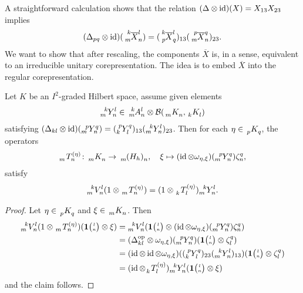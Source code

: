 A straightforward calculation shows that the relation $(\Delta\otimes \operatorname{id})(X)=X_{13}X_{23}$ implies
  \begin{align*}
    (\Delta_{pq} \otimes \id)(\Gr{\overline{X}}{k}{l}{m}{n}) =
     (\Gr{\overline{X}}{k}{l}{p}{q})_{13}(\Gr{\overline{X}}{p}{q}{m}{n})_{23}.
  \end{align*}
We want to show that after rescaling, the components  $\overline{X}$ is, in a sense, equivalent to an irreducible unitary  corepresentation. The idea is to embed $\overline{X}$ into the regular corepresentation.
\begin{Lem} \label{lem:construct-intertwiner} Let $K$ be an $I^{2}$-graded Hilbert space, assume   given elements
  \begin{align*}
    \Gr{Y}{k}{l}{m}{n}\in \Gr{A}{k}{l}{m}{n} \otimes \mathcal{B}(\Grd{K}{m}{n},\Grd{K}{k}{l})
  \end{align*}
   satisfying $    (\Delta_{kl} \otimes \id)(\Gr{Y}{p}{q}{m}{n}) =
     (\Gr{Y}{p}{q}{k}{l})_{13}(\Gr{Y}{k}{l}{m}{n})_{23}
$. Then for each $\eta\in \Grd{K}{p}{q}$,  the operators
\begin{align*}
  \Gr{T}{}{(\eta)}{m}{n} \colon
\Grd{K}{m}{n} \to  \Grd{(H_{h})}{m}{n}, \quad \xi \mapsto (\id \otimes \omega_{\eta,\xi})(\Gr{Y}{p}{q}{m}{n}) \zeta^{q}_{n},
\end{align*}
satisfy
  \begin{align*}
    \Gr{V}{k}{l}{m}{n}(1\otimes \Gr{T}{}{(\eta)}{m}{n}) = (1 \otimes
    \Gr{T}{}{(\eta)}{k}{l})\Gr{Y}{k}{l}{m}{n}.
  \end{align*}
\end{Lem}
\begin{proof}
Let $\eta \in \Grd{K}{p}{q}$ and  $\xi \in \Grd{K}{m}{n}$. Then
  \begin{align*}
    \Gr{V}{k}{l}{m}{n}(1\otimes \Gr{T}{}{(\eta)}{m}{n})(\UnitC{l}{n}\otimes \xi) &= \Gr{V}{k}{l}{m}{n}(\UnitC{l}{n}
    \otimes (\id \otimes \omega_{\eta,\xi})(\Gr{Y}{p}{q}{m}{n})\zeta^{q}_{n}) \\ &= (\Delta_{kl}^{\op}    \otimes
    \omega_{\eta,\xi})(\Gr{Y}{p}{q}{m}{n})(\UnitC{l}{n}\otimes \zeta^{q}_{l}) \\
    &= (\id \otimes \id \otimes \omega_{\eta,\xi})((\Gr{Y}{p}{q}{k}{l})_{23}(\Gr{Y}{k}{l}{m}{n})_{13})(\UnitC{l}{n}\otimes
    \zeta^{q}_{l}) \\
    &= (\id \otimes \Gr{T}{}{(\eta)}{k}{l})\Gr{Y}{k}{l}{m}{n}(\UnitC{l}{n}\otimes \xi)
  \end{align*}
and the claim follows.
\end{proof}


